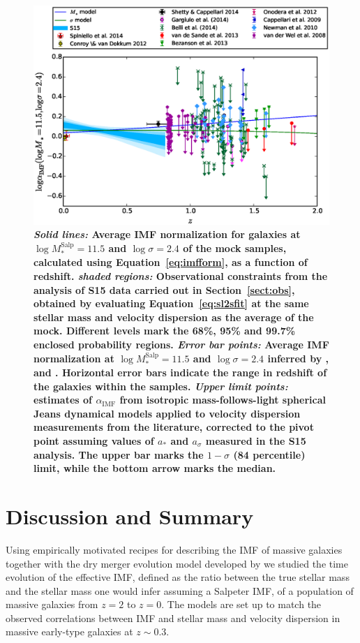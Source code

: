 \documentclass[usenatbib, letters]{mnras}
\def\msalp{M_*^{\mathrm{Salp}}}
\def\aimf{\alpha_{\mathrm{IMF}}}
\def\Sref#1{Section~\ref{#1}\xspace}
\def\Eref#1{Equation~\ref{#1}\xspace}
\begin{document}
%
\begin{figure}
 \includegraphics[width=\textwidth]{timeevol.eps}
 \caption{
{\bf
{\em Solid lines:} Average IMF normalization for galaxies at $\log{\msalp}=11.5$ and $\log{\sigma}=2.4$ of the mock samples, calculated using \Eref{eq:imfform}, as a function of redshift.
{\em shaded regions:} Observational constraints from the analysis of S15 data carried out in \Sref{sect:obs}, obtained by evaluating \Eref{eq:sl2sfit} at the same stellar mass and velocity dispersion as the average of the mock. Different levels mark the 68\%, 95\% and 99.7\% enclosed probability regions.
{\em Error bar points:} Average IMF normalization at $\log{\msalp}=11.5$ and $\log{\sigma}=2.4$ inferred by \citet{CvD12}, \citet{Spi++14} and \citet{S+C14}. Horizontal error bars indicate the range in redshift of the galaxies within the samples.
{\em Upper limit points:} estimates of $\aimf$ from isotropic mass-follows-light spherical Jeans dynamical models applied to velocity dispersion measurements from the literature, corrected to the pivot point assuming values of $a_*$ and $a_\sigma$ measured in the S15 analysis. The upper bar marks the $1-\sigma$ (84 percentile) limit, while the bottom arrow marks the median.
}
}
 \label{fig:bevol}
\end{figure}
%
\section{Discussion and Summary}\label{sect:discuss} 

Using empirically motivated recipes for describing the IMF of massive galaxies together with the dry merger evolution model developed by \citet{Nip++12} we studied the time evolution of the effective IMF, defined as the ratio between the true stellar mass and the stellar mass one would infer assuming a Salpeter IMF, of a population of massive galaxies from $z=2$ to $z=0$.
The models are set up to match the observed correlations between IMF and stellar mass and velocity dispersion in massive early-type galaxies at $z\sim0.3$.
\end{document}
